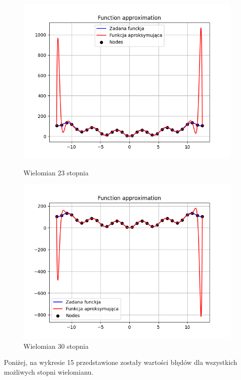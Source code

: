 \documentclass{article}
\begin{document}
\begin{figure}[H]
\begin{minipage}[b]{0.49\textwidth}
    \begin{minipage}[b]{\textwidth}
      \includegraphics[width=\textwidth]{img12.png}
      \caption{Wielomian 23 stopnia}
    \end{minipage}
    \vspace*{\fill}
    \begin{minipage}[b]{\textwidth}
      \includegraphics[width=\textwidth]{img13.png}
      \caption{Wielomian 30 stopnia}
    \end{minipage}
  \end{minipage}
\end{figure}

Poniżej, na wykresie 15 przedstawione zostały wartości błędów dla wszystkich możliwych stopni wielomianu.
\end{document}
